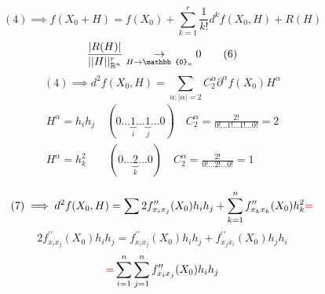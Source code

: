 \documentclass[main]{subfiles}
\begin{document}
             \begin{example}
                \[ (4) \implies f(X_0 + H) = f(X_0) + \sum^r_{k=1} \frac{1}{k!} d^k f(X_0, H) + R(H) \tag{5} \]
            \[ \frac{|R(H)|}{||H||^r_{\vR^n}} \underset{H \to \mathbb{0}_n}{\rightarrow} 0 \tag{6} \]
            \[ (4) \implies d^2f(X_0, H) = \sum_{\alpha : |\alpha| = 2} C^\alpha_2 \partial^\alpha f(X_0)H^\alpha \tag{7} \] 
            \begin{gather*}
                H^\alpha = h_i h_j \quad (0 \ldots \underbrace{1}_i \ldots \underbrace{1}_j \ldots 0) \quad C^\alpha_2 = \frac{2!}{0! \ldots 1! \ldots 1! \ldots 0!} = 2 \\
                H^\alpha = h^2_k  \quad \quad (0 \ldots \underbrace{2}_k \ldots 0) \quad  C^\alpha_2 = \frac{2!}{0! \ldots 2! \ldots 0!} = 1 \\
            \end{gather*}
               \[ (7) \implies d^2 f(X_0, H)= \sum 2 f^{\prime\prime}_{x_ix_j}(X_0) h_i h_j + \sum^n_{k=1}f^{\prime\prime}_{x_kx_k}(X_0)h^2_k \textcolor{red}{ =} \] 
               \[ 2f^{\prime\prime}_{x_ix_j}(X_0) h_ih_j = f^{\prime\prime}_{x_ix_j}(X_0)h_i h_j + f^{\prime\prime}_{x_jx_i}(X_0)h_j h_i \tag{8} \]
               \[ \textcolor{red}{ = } \sum^n_{i=1} \sum^n_{j=1} f^{\prime\prime}_{x_ix_j}(X_0) h_i h_j \]
             \end{example}
            
\end{document}
